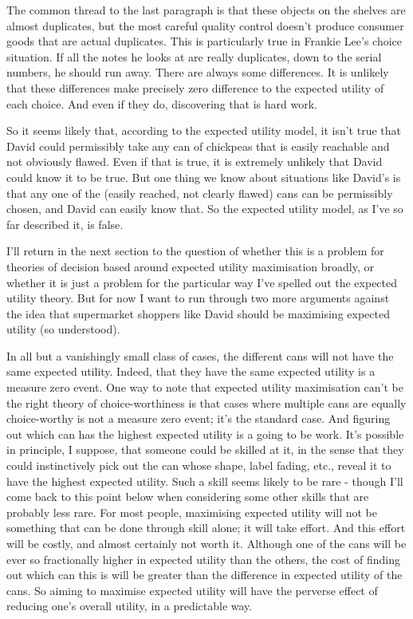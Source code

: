 \documentclass[
  12pt,
  letterpaper,
]{scrbook}
\begin{document}
The common thread to the last paragraph is that these objects on the
shelves are almost duplicates, but the most careful quality control
doesn't produce consumer goods that are actual duplicates. This is
particularly true in Frankie Lee's choice situation. If all the notes he
looks at are really duplicates, down to the serial numbers, he should
run away. There are always some differences. It is unlikely that these
differences make precisely zero difference to the expected utility of
each choice. And even if they do, discovering that is hard work.

So it seems likely that, according to the expected utility model, it
isn't true that David could permissibly take any can of chickpeas that
is easily reachable and not obviously flawed. Even if that is true, it
is extremely unlikely that David could know it to be true. But one thing
we know about situations like David's is that any one of the (easily
reached, not clearly flawed) cans can be permissibly chosen, and David
can easily know that. So the expected utility model, as I've so far
described it, is false.

I'll return in the next section to the question of whether this is a
problem for theories of decision based around expected utility
maximisation broadly, or whether it is just a problem for the particular
way I've spelled out the expected utility theory. But for now I want to
run through two more arguments against the idea that supermarket
shoppers like David should be maximising expected utility (so
understood).

In all but a vanishingly small class of cases, the different cans will
not have the same expected utility. Indeed, that they have the same
expected utility is a measure zero event. One way to note that expected
utility maximisation can't be the right theory of choice-worthiness is
that cases where multiple cans are equally choice-worthy is not a
measure zero event; it's the standard case. And figuring out which can
has the highest expected utility is a going to be work. It's possible in
principle, I suppose, that someone could be skilled at it, in the sense
that they could instinctively pick out the can whose shape, label
fading, etc., reveal it to have the highest expected utility. Such a
skill seems likely to be rare - though I'll come back to this point
below when considering some other skills that are probably less rare.
For most people, maximising expected utility will not be something that
can be done through skill alone; it will take effort. And this effort
will be costly, and almost certainly not worth it. Although one of the
cans will be ever so fractionally higher in expected utility than the
others, the cost of finding out which can this is will be greater than
the difference in expected utility of the cans. So aiming to maximise
expected utility will have the perverse effect of reducing one's overall
utility, in a predictable way.
\end{document}
